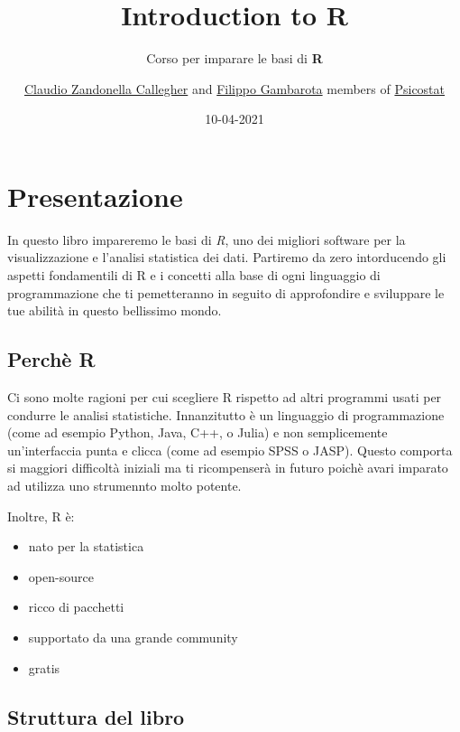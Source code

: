 \documentclass[
]{book}
\title{{Introduction to R}}
\subtitle{Corso per imparare le basi di \textbf{R}}
\author{\href{https://claudiozandonella.netlify.app/}{Claudio Zandonella Callegher} and \href{https://filippogambarota.netlify.app/}{Filippo Gambarota} members of \href{https://psicostat.dpss.psy.unipd.it/}{Psicostat}}
\date{10-04-2021}
\providecommand{\tightlist}{%
  \setlength{\itemsep}{0pt}\setlength{\parskip}{0pt}}
\begin{document}
\maketitle

{
\setcounter{tocdepth}{1}
\tableofcontents
}
\hypertarget{presentazione}{%
\chapter*{Presentazione}\label{presentazione}}

In questo libro impareremo le basi di \emph{R}, uno dei migliori software per la visualizzazione e l'analisi statistica dei dati. Partiremo da zero intorducendo gli aspetti fondamentili di R e i concetti alla base di ogni linguaggio di programmazione che ti pemetteranno in seguito di approfondire e sviluppare le tue abilità in questo bellissimo mondo.

\hypertarget{perchuxe8-r}{%
\section*{Perchè R}\label{perchuxe8-r}}

Ci sono molte ragioni per cui scegliere R rispetto ad altri programmi usati per condurre le analisi statistiche. Innanzitutto è un linguaggio di programmazione (come ad esempio Python, Java, C++, o Julia) e non semplicemente un'interfaccia punta e clicca (come ad esempio SPSS o JASP). Questo comporta si maggiori difficoltà iniziali ma ti ricompenserà in futuro poichè avari imparato ad utilizza uno strumennto molto potente.

Inoltre, R è:

\begin{itemize}
\tightlist
\item
  nato per la statistica
\item
  open-source
\item
  ricco di pacchetti
\item
  supportato da una grande community
\item
  gratis
\end{itemize}

\hypertarget{struttura-del-libro}{%
\section*{Struttura del libro}\label{struttura-del-libro}}
\end{document}
